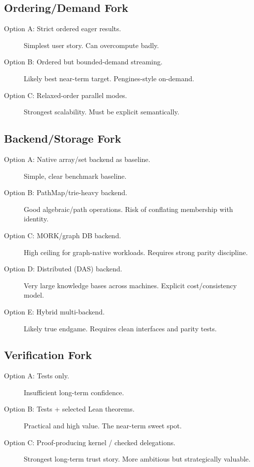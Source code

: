 \documentclass[11pt]{article}
\newcommand{\PathMap}{\textup{PathMap}}
\newcommand{\MORK}{\textup{MORK}}
\begin{document}
\subsection{Ordering/Demand Fork}

\begin{description}
\item[Option A: Strict ordered eager results.]
  Simplest user story.  Can overcompute badly.
\item[Option B: Ordered but bounded-demand streaming.]
  Likely best near-term target.  Pengines-style on-demand.
\item[Option C: Relaxed-order parallel modes.]
  Strongest scalability.  Must be explicit semantically.
\end{description}

\subsection{Backend/Storage Fork}

\begin{description}
\item[Option A: Native array/set backend as baseline.]
  Simple, clear benchmark baseline.
\item[Option B: \PathMap{}/trie-heavy backend.]
  Good algebraic/path operations.  Risk of conflating membership with identity.
\item[Option C: \MORK{}/graph DB backend.]
  High ceiling for graph-native workloads.  Requires strong parity discipline.
\item[Option D: Distributed (DAS) backend.]
  Very large knowledge bases across machines.  Explicit cost/consistency model.
\item[Option E: Hybrid multi-backend.]
  Likely true endgame.  Requires clean interfaces and parity tests.
\end{description}

\subsection{Verification Fork}

\begin{description}
\item[Option A: Tests only.]
  Insufficient long-term confidence.
\item[Option B: Tests + selected Lean theorems.]
  Practical and high value.  The near-term sweet spot.
\item[Option C: Proof-producing kernel / checked delegations.]
  Strongest long-term trust story.  More ambitious but strategically valuable.
\end{description}
\end{document}
